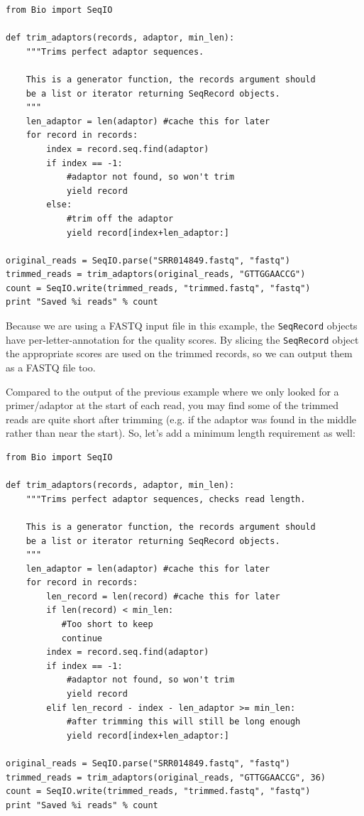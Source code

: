 \documentclass{report}
\begin{document}
\begin{verbatim}
from Bio import SeqIO

def trim_adaptors(records, adaptor, min_len):
    """Trims perfect adaptor sequences.
    
    This is a generator function, the records argument should
    be a list or iterator returning SeqRecord objects.
    """
    len_adaptor = len(adaptor) #cache this for later
    for record in records:
        index = record.seq.find(adaptor)
        if index == -1:
            #adaptor not found, so won't trim
            yield record
        else:
            #trim off the adaptor
            yield record[index+len_adaptor:]

original_reads = SeqIO.parse("SRR014849.fastq", "fastq")
trimmed_reads = trim_adaptors(original_reads, "GTTGGAACCG")
count = SeqIO.write(trimmed_reads, "trimmed.fastq", "fastq") 
print "Saved %i reads" % count
\end{verbatim}

Because we are using a FASTQ input file in this example, the \verb|SeqRecord|
objects have per-letter-annotation for the quality scores. By slicing the
\verb|SeqRecord| object the appropriate scores are used on the trimmed
records, so we can output them as a FASTQ file too.

Compared to the output of the previous example where we only looked for
a primer/adaptor at the start of each read, you may find some of the
trimmed reads are quite short after trimming (e.g. if the adaptor was
found in the middle rather than near the start). So, let's add a minimum
length requirement as well:

\begin{verbatim}
from Bio import SeqIO

def trim_adaptors(records, adaptor, min_len):
    """Trims perfect adaptor sequences, checks read length.
    
    This is a generator function, the records argument should
    be a list or iterator returning SeqRecord objects.
    """
    len_adaptor = len(adaptor) #cache this for later
    for record in records:
        len_record = len(record) #cache this for later
        if len(record) < min_len:
           #Too short to keep
           continue
        index = record.seq.find(adaptor)
        if index == -1:
            #adaptor not found, so won't trim
            yield record
        elif len_record - index - len_adaptor >= min_len:
            #after trimming this will still be long enough
            yield record[index+len_adaptor:]

original_reads = SeqIO.parse("SRR014849.fastq", "fastq")
trimmed_reads = trim_adaptors(original_reads, "GTTGGAACCG", 36)
count = SeqIO.write(trimmed_reads, "trimmed.fastq", "fastq") 
print "Saved %i reads" % count
\end{verbatim}
\end{document}
